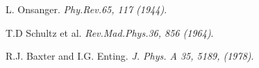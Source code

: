 
\cleardoublepage
{}
\begin{thebibliography}{99}

L. Onsanger.
\textit{Phy.Rev.65, 117 (1944)}. 

T.D Schultz et al.
\textit{Rev.Mad.Phys.36, 856 (1964)}. 

R.J. Baxter and I.G. Enting.
\textit{J. Phys. A 35, 5189, (1978)}. 


%

\end{thebibliography}